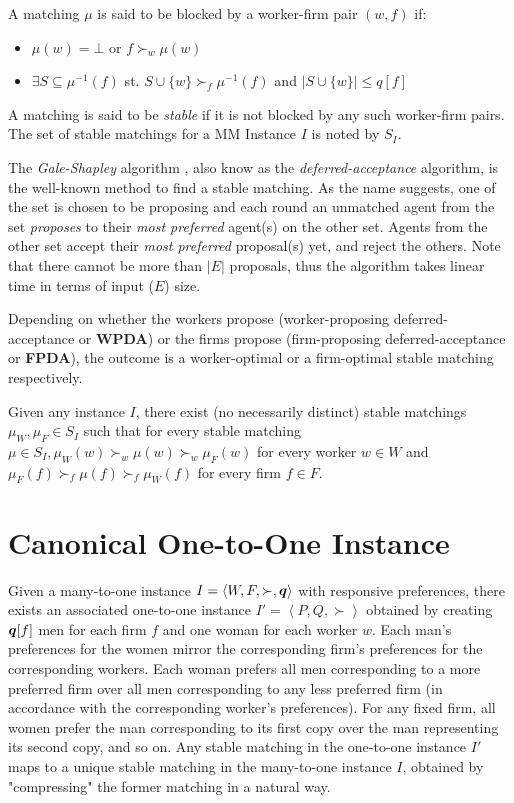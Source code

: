A matching $\mu$ is said to be blocked by a worker-firm pair $(w, f)$ if:
\begin{itemize}
  \item $\mu(w) = \bot$ or $f \succ_w \mu(w)$
  \item $\exists S \subseteq \mu^{-1}(f)$ st. $S \cup \{w\} \succ_f \mu^{-1}(f)$ and $|S \cup \{w\}| \leq q[f]$
\end{itemize}

A matching is said to be \textit{stable} if it is not blocked by any such worker-firm pairs. The set of stable matchings for a MM Instance $I$ is noted by $S_I$.

The \textit{Gale-Shapley} algorithm \cite{gale1962college}, also know as the \textit{deferred-acceptance} algorithm, is the well-known method to find a stable matching. As the name suggests, one of the set is chosen to be proposing and each round an unmatched agent from the set \textit{proposes} to their \textit{most preferred} agent(s) on the other set. Agents from the other set accept their \textit{most preferred} proposal(s) yet, and reject the others. Note that there cannot be more than $|E|$ proposals, thus the algorithm takes linear time in terms of input ($E$) size.

Depending on whether the workers propose (worker-proposing deferred-acceptance or \textbf{WPDA}) or the firms propose (firm-proposing deferred-acceptance or \textbf{FPDA}), the outcome is a worker-optimal or a firm-optimal stable matching respectively.

\begin{proposition}
  Given any instance $I$, there exist (no necessarily distinct) stable matchings $\mu_W, \mu_F \in S_I$ such that for every stable matching $\mu \in S_I, \mu_W(w) \succ_w \mu(w) \succ_w \mu_F(w)$ for every worker $w \in W$ and $\mu_F(f) \succ_f \mu(f) \succ_f \mu_W(f)$ for every firm $f \in F$.
\end{proposition}

\section{Canonical One-to-One Instance}
\label{sec:canonical-instance}

Given a many-to-one instance $I = \left< W, F, \succ, \boldsymbol{q} \right>$ with responsive preferences, there exists an associated one-to-one instance $I' = \left< P, Q, \succ \right>$ obtained by creating $\boldsymbol{q}[f]$ men for each firm $f$ and one woman for each worker $w$. Each man's preferences for the women mirror the corresponding firm's preferences for the corresponding workers. Each woman prefers all men corresponding to a more preferred firm over all men corresponding to any less preferred firm (in accordance with the corresponding worker's preferences). For any fixed firm, all women prefer the man corresponding to its first copy over the man representing its second copy, and so on. Any stable matching in the one-to-one instance $I'$ maps to a unique stable matching in the many-to-one instance $I$, obtained by "compressing" the former matching in a natural way.

